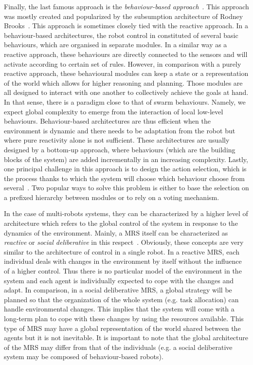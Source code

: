     Finally, the last famous approach is the \emph{behaviour-based approach}~\cite{Arkin1998}. This approach was mostly created and popularized by the subsumption architecture of Rodney Brooks~\cite{Brooks1986}. This approach is sometimes closely tied with the reactive approach. In a behaviour-based architectures, the robot control in constituted of several basic behaviours, which are organised in separate modules. In a similar way as a reactive approach, these behaviours are directly connected to the sensors and will activate according to certain set of rules. However, in comparison with a purely reactive approach, these behavioural modules can keep a state or a representation of the world which allows for higher reasoning and planning. Those modules are all designed to interact with one another to collectively achieve the goals at hand. In that sense, there is a paradigm close to that of swarm behaviours. Namely, we expect global complexity to emerge from the interaction of local low-level behaviours. Behaviour-based architectures are thus efficient when the environment is dynamic and there needs to be adaptation from the robot but where pure reactivity alone is not sufficient. These architectures are usually designed by a bottom-up approach, where behaviours (which are the building blocks of the system) are added incrementally in an increasing complexity. Lastly, one principal challenge in this approach is to design the action selection, which is the process thanks to which the system will choose which behaviour choose from several~\cite{Pirjanian2000}. Two popular ways to solve this problem is either to base the selection on a prefixed hierarchy between modules or to rely on a voting mechanism.

    In the case of multi-robots systems, they can be characterized by a higher level of architecture which refers to the global control of the system in response to the dynamics of the environment. Mainly, a MRS itself can be characterized as \emph{reactive} or \emph{social deliberative} in this respect~\cite{Iocchi2001, Carpin2001}. Obviously, these concepts are very similar to the architecture of control in a single robot. In a reactive MRS, each individual deals with changes in the environment by itself without the influence of a higher control. Thus there is no particular model of the environment in the system and each agent is individually expected to cope with the changes and adapt. In comparison, in a social deliberative MRS, a global strategy will be planned so that the organization of the whole system (e.g. task allocation) can handle environmental changes. This implies that the system will come with a long-term plan to cope with these changes by using the resources available. This type of MRS may have a global representation of the world shared between the agents but it is not inevitable. It is important to note that the global architecture of the MRS may differ from that of the individuals (e.g. a social deliberative system may be composed of behaviour-based robots).

